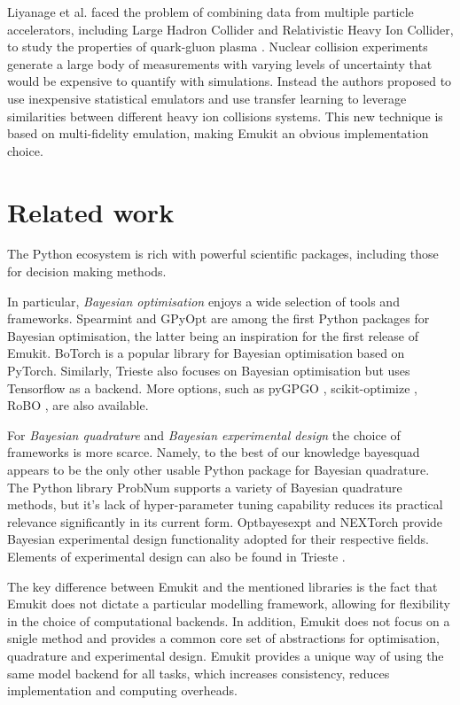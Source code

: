Liyanage et al. faced the problem of combining data from multiple particle accelerators, including Large Hadron Collider and Relativistic Heavy Ion Collider, to study the properties of quark-gluon plasma \cite{PhysRevC105034910}. Nuclear collision experiments generate a large body of measurements with varying levels of uncertainty that would be expensive to quantify with simulations. Instead the authors proposed to use inexpensive statistical emulators and use transfer learning to leverage similarities between different heavy ion collisions systems. This new technique is based on multi-fidelity emulation, making Emukit an obvious implementation choice.

\section{Related work}
The Python ecosystem is rich with powerful scientific packages, including those for decision making methods.

In particular, \emph{Bayesian optimisation} enjoys a wide selection of tools and frameworks. Spearmint \cite{snoek2012practical} and GPyOpt \cite{gpyopt2016} are among the first Python packages for Bayesian optimisation, the latter being an inspiration for the first release of Emukit. BoTorch \cite{balandat2020botorch} is a popular library for Bayesian optimisation based on PyTorch. Similarly, Trieste \cite{picheny2023trieste} also focuses on Bayesian optimisation but uses Tensorflow as a backend. More options, such as pyGPGO \cite{jimenez2017pygpgo}, scikit-optimize \cite{louppe2017bayesian}, RoBO \cite{klein-bayesopt17}, are also available.

For \emph{Bayesian quadrature} and \emph{Bayesian experimental design} the choice of frameworks is more scarce. Namely, to the best of our knowledge bayesquad \cite{Charles2013} appears to be the only other usable Python package for Bayesian quadrature. The Python library ProbNum \cite{Wenger21} supports a variety of Bayesian quadrature methods, but it's lack of hyper-parameter tuning capability reduces its practical relevance significantly in its current form. Optbayesexpt \cite{mcmichael2021optbayesexpt} and NEXTorch \cite{wang2021nextorch} provide Bayesian experimental design functionality adopted for their respective fields. Elements of experimental design can also be found in Trieste \cite{picheny2023trieste}.

The key difference between Emukit and the mentioned libraries is the fact that Emukit does not dictate a particular modelling framework, allowing for flexibility in the choice of computational backends. In addition, Emukit does not focus on a snigle method and provides a common core set of abstractions for optimisation, quadrature and experimental design. Emukit provides a unique way of using the same model backend for all tasks, which increases consistency, reduces implementation and computing overheads.


